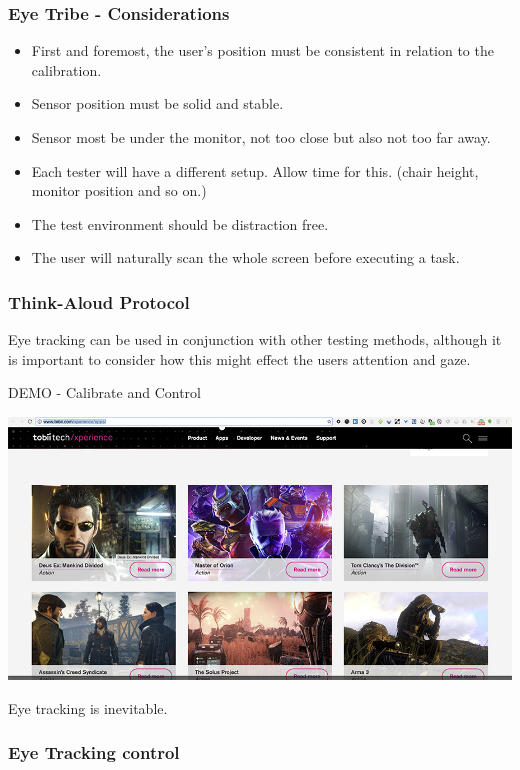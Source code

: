 \begin{frame}
	\frametitle{Eye Tribe - Considerations}
	\begin{itemize}
		\item First and foremost, the user's position must be consistent in relation to the calibration. 
		\item Sensor position must be solid and stable. 
		\item Sensor most be under the monitor, not too close but also not too far away. 
		\item Each tester will have a different setup. Allow time for this. (chair height, monitor position and so on.)
		\item The test environment should be distraction free. 
		\item The user will naturally scan the whole screen before executing a task.
	\end{itemize}
\end{frame}

\begin{frame}
	\frametitle{Think-Aloud Protocol}

	Eye tracking can be used in conjunction with other testing methods, although it is important to consider how this might effect the users attention and gaze. 
\end{frame}


\begin{frame}
	\huge{DEMO - Calibrate and Control}
	\begin{center}
		\href{http://www.tobii.com/xperience/apps/}{\includegraphics[scale=.3]{assets/games} }
	\end{center}
	Eye tracking is inevitable.
\end{frame}

\begin{frame}
	\frametitle{Eye Tracking control}
\end{frame}










